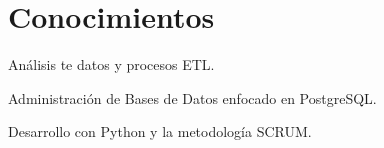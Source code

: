 \begin{minipage}[t]{0.66\textwidth}

\section{Conocimientos}

\vspace{\topsep} %
\begin{tightitemize}
\item Análisis te datos y procesos ETL.
\item Administración de Bases de Datos enfocado en PostgreSQL.
\item Desarrollo con Python y la metodología SCRUM.
\end{tightitemize}

\sectionspace %



\end{minipage} %
\vspace*{\fill}
\center{\textcolor{gray}{1}}
